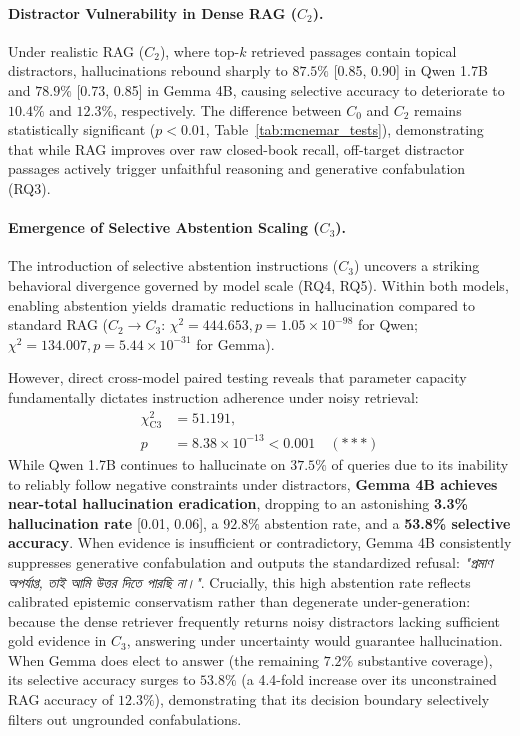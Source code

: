 \paragraph{Distractor Vulnerability in Dense RAG ($C_2$).}
Under realistic RAG ($C_2$), where top-$k$ retrieved passages contain topical distractors, hallucinations rebound sharply to $87.5\%$ [0.85, 0.90] in Qwen 1.7B and $78.9\%$ [0.73, 0.85] in Gemma 4B, causing selective accuracy to deteriorate to $10.4\%$ and $12.3\%$, respectively. The difference between $C_0$ and $C_2$ remains statistically significant ($p < 0.01$, Table~\ref{tab:mcnemar_tests}), demonstrating that while RAG improves over raw closed-book recall, off-target distractor passages actively trigger unfaithful reasoning and generative confabulation (RQ3).

\paragraph{Emergence of Selective Abstention Scaling ($C_3$).}
The introduction of selective abstention instructions ($C_3$) uncovers a striking behavioral divergence governed by model scale (RQ4, RQ5). Within both models, enabling abstention yields dramatic reductions in hallucination compared to standard RAG ($C_2 \rightarrow C_3$: $\chi^2 = 444.653, p = 1.05 \times 10^{-98}$ for Qwen; $\chi^2 = 134.007, p = 5.44 \times 10^{-31}$ for Gemma).

However, direct cross-model paired testing reveals that parameter capacity fundamentally dictates instruction adherence under noisy retrieval:
\begin{equation}
\begin{split}
    \chi^2_{\text{C3}} &= 51.191, \\
    p &= 8.38 \times 10^{-13} < 0.001 \quad (***)
\end{split}
\label{eq:scaling_mcnemar}
\end{equation}
While Qwen 1.7B continues to hallucinate on $37.5\%$ of queries due to its inability to reliably follow negative constraints under distractors, \textbf{Gemma 4B achieves near-total hallucination eradication}, dropping to an astonishing \textbf{3.3\% hallucination rate} [0.01, 0.06], a $92.8\%$ abstention rate, and a \textbf{53.8\% selective accuracy}. When evidence is insufficient or contradictory, Gemma 4B consistently suppresses generative confabulation and outputs the standardized refusal: \foreignlanguage{bengali}{\emph{"প্রমাণ অপর্যাপ্ত, তাই আমি উত্তর দিতে পারছি না।"}}. Crucially, this high abstention rate reflects calibrated epistemic conservatism rather than degenerate under-generation: because the dense retriever frequently returns noisy distractors lacking sufficient gold evidence in $C_3$, answering under uncertainty would guarantee hallucination. When Gemma does elect to answer (the remaining $7.2\%$ substantive coverage), its selective accuracy surges to $53.8\%$ (a 4.4-fold increase over its unconstrained RAG accuracy of $12.3\%$), demonstrating that its decision boundary selectively filters out ungrounded confabulations.

